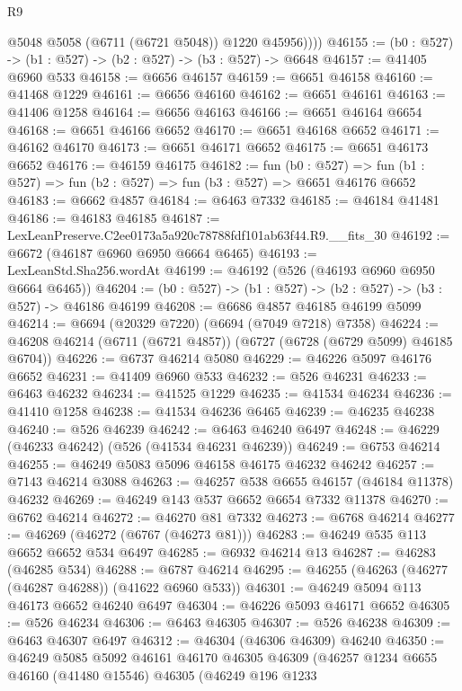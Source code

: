 \begin{lexlean}{R9}
\begin{coremodule}
            @5048
            @5058
            (@6711 (@6721 @5048))
            @1220
            @45956))))
@46155 := (b0 : @527) -> (b1 : @527) -> (b2 : @527) -> (b3 : @527) -> @6648
@46157 := @41405 @6960 @533
@46158 := @6656 @46157
@46159 := @6651 @46158
@46160 := @41468 @1229
@46161 := @6656 @46160
@46162 := @6651 @46161
@46163 := @41406 @1258
@46164 := @6656 @46163
@46166 := @6651 @46164 @6654
@46168 := @6651 @46166 @6652
@46170 := @6651 @46168 @6652
@46171 := @46162 @46170
@46173 := @6651 @46171 @6652
@46175 := @6651 @46173 @6652
@46176 := @46159 @46175
@46182 := fun (b0 : @527) =>
  fun (b1 : @527) => fun (b2 : @527) => fun (b3 : @527) => @6651 @46176 @6652
@46183 := @6662 @4857
@46184 := @6463 @7332
@46185 := @46184 @41481
@46186 := @46183 @46185
@46187 := LexLeanPreserve.C2ee0173a5a920c78788fdf101ab63f44.R9.__fits_30
@46192 := @6672 (@46187 @6960 @6950 @6664 @6465)
@46193 := LexLeanStd.Sha256.wordAt
@46199 := @46192 (@526 (@46193 @6960 @6950 @6664 @6465))
@46204 := (b0 : @527) -> (b1 : @527) -> (b2 : @527) -> (b3 : @527) -> @46186 @46199
@46208 := @6686 @4857 @46185 @46199 @5099
@46214 := @6694 (@20329 @7220) (@6694 (@7049 @7218) @7358)
@46224 := @46208 @46214 (@6711 (@6721 @4857)) (@6727 (@6728 (@6729 @5099) @46185 @6704))
@46226 := @6737 @46214 @5080
@46229 := @46226 @5097 @46176 @6652
@46231 := @41409 @6960 @533
@46232 := @526 @46231
@46233 := @6463 @46232
@46234 := @41525 @1229
@46235 := @41534 @46234
@46236 := @41410 @1258
@46238 := @41534 @46236 @6465
@46239 := @46235 @46238
@46240 := @526 @46239
@46242 := @6463 @46240 @6497
@46248 := @46229 (@46233 @46242) (@526 (@41534 @46231 @46239))
@46249 := @6753 @46214
@46255 := @46249 @5083 @5096 @46158 @46175 @46232 @46242
@46257 := @7143 @46214 @3088
@46263 := @46257 @538 @6655 @46157 (@46184 @11378) @46232
@46269 := @46249 @143 @537 @6652 @6654 @7332 @11378
@46270 := @6762 @46214
@46272 := @46270 @81 @7332
@46273 := @6768 @46214
@46277 := @46269 (@46272 (@6767 (@46273 @81)))
@46283 := @46249 @535 @113 @6652 @6652 @534 @6497
@46285 := @6932 @46214 @13
@46287 := @46283 (@46285 @534)
@46288 := @6787 @46214
@46295 := @46255 (@46263 (@46277 (@46287 @46288)) (@41622 @6960 @533))
@46301 := @46249 @5094 @113 @46173 @6652 @46240 @6497
@46304 := @46226 @5093 @46171 @6652
@46305 := @526 @46234
@46306 := @6463 @46305
@46307 := @526 @46238
@46309 := @6463 @46307 @6497
@46312 := @46304 (@46306 @46309) @46240
@46350 := @46249
    @5085
    @5092
    @46161
    @46170
    @46305
    @46309
    (@46257
      @1234
      @6655
      @46160
      (@41480 @15546)
      @46305
      (@46249
        @196
        @1233

\end{coremodule}
\end{lexlean}
